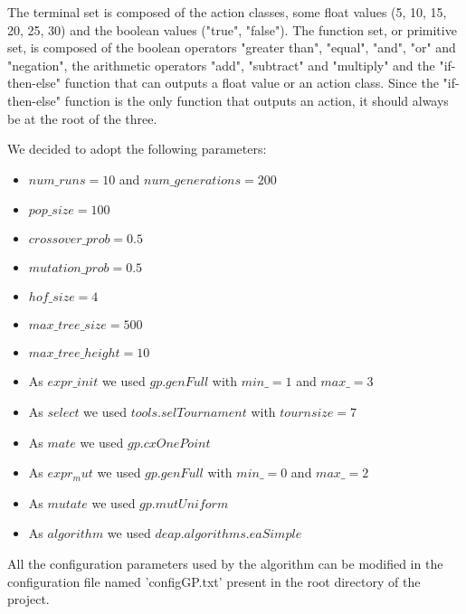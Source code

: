 The terminal set is composed of the action classes, some float values (5, 10, 15, 20, 25, 30)
and the boolean values ("true", "false"). The function set, or primitive set, is composed of the
boolean operators "greater than", "equal", "and", "or" and "negation", the arithmetic operators
"add", "subtract" and "multiply" and the "if-then-else" function that can outputs a float value or
an action class. Since the "if-then-else" function is the only function that outputs an action, it
should always be at the root of the three.

We decided to adopt the following parameters:
\begin{itemize}
    \item $num\_runs = 10$ and $num\_generations = 200$
    \item $pop\_size = 100$
    \item $crossover\_prob = 0.5$
    \item $mutation\_prob = 0.5$
    \item $hof\_size = 4$
    \item $max\_tree\_size = 500$
    \item $max\_tree\_height = 10$
    \item As $expr\_init$ we used $gp.genFull$ with $min\_ = 1$ and $max\_ = 3$
    \item As $select$ we used $tools.selTournament$ with $tournsize = 7$
    \item As $mate$ we used $gp.cxOnePoint$
    \item As $expr_mut$ we used $gp.genFull$ with $min\_ = 0$ and $max\_ = 2$
    \item As $mutate$ we used $gp.mutUniform$
    \item As $algorithm$ we used $deap.algorithms.eaSimple$
    
\end{itemize}

All the configuration parameters used by the algorithm can be modified in the configuration
file named 'configGP.txt' present in the root directory of the project.
